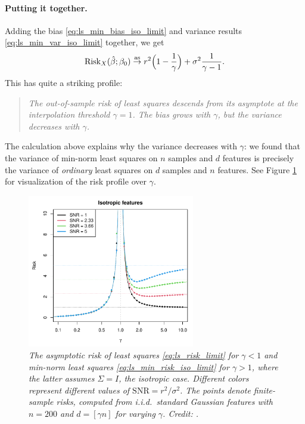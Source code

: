 \documentclass{article}
\begin{document}
\paragraph{Putting it together.}

Adding the bias \eqref{eq:ls_min_bias_iso_limit} and variance results
\eqref{eq:ls_min_var_iso_limit} together, we get
\begin{equation}
\label{eq:ls_min_risk_iso_limit}
\mathrm{Risk}_X(\hat{\beta}; \beta_0) \overset{\mathrm{as}}{\to} r^2 \Big( 1- \frac{1}{\gamma} \Big) + \sigma^2 
\frac{1}{\gamma-1}. 
\end{equation}
This has quite a striking profile:
\begin{quote}
\centering\it
The out-of-sample risk of least squares descends from its asymptote at the
interpolation threshold $\gamma = 1$. The bias grows with $\gamma$, but 
the variance decreases with $\gamma$.      
\end{quote}
The calculation above explains why the variance decreases with $\gamma$: we
found that the variance of min-norm least squares on $n$ samples and $d$
features is precisely the variance of \emph{ordinary} least squares on $d$
samples and $n$ features. See Figure \ref{fig:risk_iso} for visualization of the
risk profile over $\gamma$.

\begin{figure}[htb]
\centering
\includegraphics[width=0.65\textwidth]{risk_iso.pdf}
\caption{\it The asymptotic risk of least squares \eqref{eq:ls_risk_limit} for
  $\gamma<1$ and min-norm least squares \eqref{eq:ls_min_risk_iso_limit} for
  $\gamma>1$, where the latter assumes $\Sigma = I$, the isotropic
  case. Different colors represent different values of $\mathrm{SNR} = r^2 /
  \sigma^2$. The points denote finite-sample risks, computed from i.i.d.\
  standard Gaussian features with $n=200$ and $d=[\gamma n]$ for varying
  $\gamma$. Credit: \citet{hastie2022surprises}.}  
\label{fig:risk_iso}
\end{figure}
\end{document}
